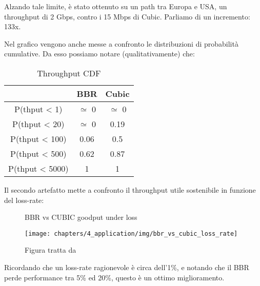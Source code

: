 Alzando tale limite, è stato ottenuto su un path tra Europa e USA, un throughput di 2 Gbps, contro i 15 Mbps di Cubic. Parliamo di un incremento: 133x. \bigskip

Nel grafico vengono anche messe a confronto le distribuzioni di probabilità cumulative. Da esso possiamo notare (qualitativamente) che:

\begin{table}[H]

\centering
\caption{Throughput CDF}	

\begin{tabular}{ccc}

\toprule
 & BBR & Cubic \\
\midrule
P(thput < 1) & $ \simeq $ 0 & $ \simeq $ 0 \\
\midrule
P(thput < 20) & $ \simeq $ 0 & 0.19  \\
\midrule
P(thput < 100) & 0.06 & 0.5 \\
\midrule
P(thput < 500) & 0.62 & 0.87  \\
\midrule
P(thput < 5000) & 1 & 1  \\
\bottomrule

\end{tabular}
\end{table}

Il secondo artefatto mette a confronto il throughput utile sostenibile in funzione del loss-rate:

\begin{figure}[H]

\center
\caption{BBR vs CUBIC goodput under loss}
\texttt{[image: chapters/4\_application/img/bbr\_vs\_cubic\_loss\_rate]}
\caption*{Figura tratta da \cite[p.~65]{Cardwell:2017:BCC:3042068.3009824}}

\end{figure}

Ricordando che un loss-rate ragionevole è circa dell'1\%, e notando che il BBR perde performance tra 5\% ed 20\%, questo è un ottimo miglioramento.

